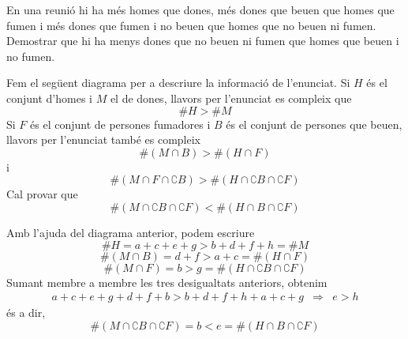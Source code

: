 \begin{exercici}
En una reuni\'{o} hi ha m\'{e}s homes que dones, m\'{e}s dones que beuen que
homes que fumen i m\'{e}s dones que fumen i no beuen que homes que no beuen
ni fumen. Demostrar que hi ha menys dones que no beuen ni fumen que homes
que beuen i no fumen.
\end{exercici}

\begin{solucio}
Fem el seg\"{u}ent diagrama per a descriure la informaci\'{o} de l'enunciat.%
Si $H$ \'{e}s el
conjunt d'homes i $M$ el de dones, llavors per l'enunciat es compleix que%
\begin{equation*}
\#H>\#M
\end{equation*}%
Si $F$ \'{e}s el conjunt de persones fumadores i $B$ \'{e}s el conjunt de
persones que beuen, llavors per l'enunciat tamb\'{e} es compleix%
\begin{equation*}
\#\left( M\cap B\right) >\#\left( H\cap F\right)
\end{equation*}%
i%
\begin{equation*}
\#\left( M\cap F\cap \complement B\right) >\#\left( H\cap \complement B\cap
\complement F\right)
\end{equation*}%
Cal provar que%
\begin{equation*}
\#\left( M\cap \complement B\cap \complement F\right) <\#\left( H\cap B\cap
\complement F\right)
\end{equation*}

Amb l'ajuda del diagrama anterior, podem escriure%
\begin{equation*}
\#H=a+c+e+g>b+d+f+h=\#M
\end{equation*}%
\begin{equation*}
\#\left( M\cap B\right) =d+f>a+c=\#\left( H\cap F\right)
\end{equation*}%
\begin{equation*}
\#\left( M\cap F\right) =b>g=\#\left( H\cap \complement B\cap \complement
F\right)
\end{equation*}%
Sumant membre a membre les tres desigualtats anteriors, obtenim%
\begin{equation*}
\begin{array}{ccc}
a+c+e+g+d+f+b>b+d+f+h+a+c+g & \Longrightarrow & e>h%
\end{array}%
\end{equation*}%
\'{e}s a dir,%
\begin{equation*}
\#\left( M\cap \complement B\cap \complement F\right) =b<e=\#\left( H\cap
B\cap \complement F\right)
\end{equation*}
\end{solucio}

